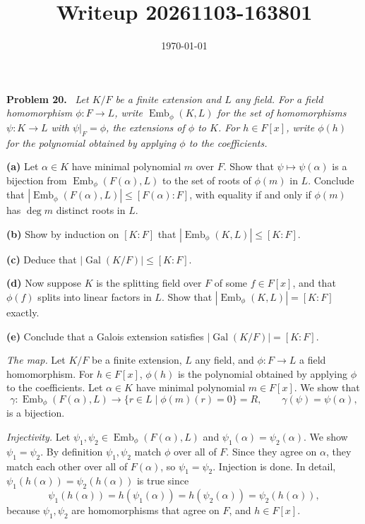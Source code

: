 \documentclass[11pt]{article}
\title{Writeup 20261103-163801}
\author{}
\date{\today}
\newenvironment{problem}[1]
  {\par\medskip\noindent\textbf{Problem #1.}\ \itshape}
  {\par\medskip}
\begin{document}
\maketitle


\begin{problem}{20}
Let $K/F$ be a finite extension and $L$ any field. For a field homomorphism $\phi\colon F\to L$, write $\operatorname{Emb}_\phi(K,L)$ for the set of homomorphisms $\psi\colon K\to L$ with $\psi|_F=\phi$, the extensions of $\phi$ to $K$. For $h\in F[x]$, write $\phi(h)$ for the polynomial obtained by applying $\phi$ to the coefficients.

\textbf{(a)} Let $\alpha\in K$ have minimal polynomial $m$ over $F$. Show that $\psi\mapsto\psi(\alpha)$ is a bijection from $\operatorname{Emb}_\phi(F(\alpha),L)$ to the set of roots of $\phi(m)$ in $L$. Conclude that $|\operatorname{Emb}_\phi(F(\alpha),L)|\le[F(\alpha):F]$, with equality if and only if $\phi(m)$ has $\deg m$ distinct roots in $L$.

\textbf{(b)} Show by induction on $[K:F]$ that $|\operatorname{Emb}_\phi(K,L)|\le[K:F]$.

\textbf{(c)} Deduce that $|\operatorname{Gal}(K/F)|\le[K:F]$.

\textbf{(d)} Now suppose $K$ is the splitting field over $F$ of some $f\in F[x]$, and that $\phi(f)$ splits into linear factors in $L$. Show that $|\operatorname{Emb}_\phi(K,L)|=[K:F]$ exactly.

\textbf{(e)} Conclude that a Galois extension satisfies $|\operatorname{Gal}(K/F)|=[K:F]$.
\end{problem}
\emph{The map.} Let $K/F$ be a finite extension, $L$ any field, and $\phi\colon F\to L$ a field homomorphism. For $h\in F[x]$, $\phi(h)$ is the polynomial obtained by applying $\phi$ to the coefficients. Let $\alpha\in K$ have minimal polynomial $m\in F[x]$. We show that
\[
\gamma\colon\operatorname{Emb}_\phi(F(\alpha),L)\longrightarrow\{r\in L\mid\phi(m)(r)=0\}=R,\qquad \gamma(\psi)=\psi(\alpha),
\]
is a bijection.

\emph{Injectivity.} Let $\psi_1,\psi_2\in\operatorname{Emb}_\phi(F(\alpha),L)$ and $\psi_1(\alpha)=\psi_2(\alpha)$. We show $\psi_1=\psi_2$. By definition $\psi_1,\psi_2$ match $\phi$ over all of $F$. Since they agree on $\alpha$, they match each other over all of $F(\alpha)$, so $\psi_1=\psi_2$. Injection is done. In detail, $\psi_1(h(\alpha))=\psi_2(h(\alpha))$ is true since
\[
\psi_1(h(\alpha))=h(\psi_1(\alpha))=h(\psi_2(\alpha))=\psi_2(h(\alpha)),
\]
because $\psi_1,\psi_2$ are homomorphisms that agree on $F$, and $h\in F[x]$.
\end{document}
